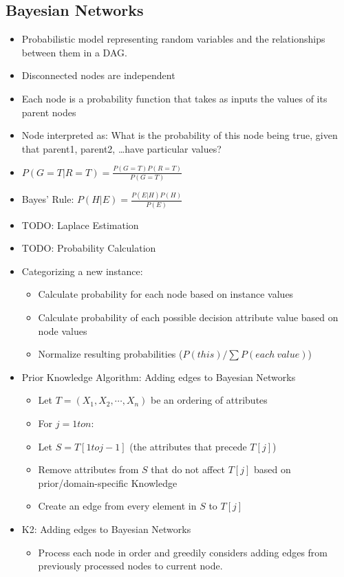 \documentclass{article}
\begin{document}
\subsection{Bayesian Networks}
\begin{itemize}
	\item Probabilistic model representing random variables and the relationships between them in a DAG.
	\item Disconnected nodes are independent
	\item Each node is a probability function that takes as inputs the values of its parent nodes
	\item Node interpreted as: What is the probability of this node being true, given that parent1, parent2, \ldots have particular values?
	\item $P(G = T | R = T) = \frac{P(G = T) P(R = T)}{P(G = T)}$
	\item Bayes' Rule: $P(H | E) = \frac{P(E | H) P(H)}{P(E)}$
	\item TODO: Laplace Estimation
	\item TODO: Probability Calculation
	\item Categorizing a new instance:
		\begin{itemize}
			\item Calculate probability for each node based on instance values
			\item Calculate probability of each possible decision attribute value based on node values
			\item Normalize resulting probabilities ($P(this) / \sum P(each\ value)$)
		\end{itemize}
	\item Prior Knowledge Algorithm: Adding edges to Bayesian Networks
		\begin{itemize}
			\item Let $T = (X_1, X_2, \cdots, X_n)$ be an ordering of attributes
			\item For $j = 1 to n$:
			\item Let $S = T[1 to j - 1]$ (the attributes that precede $T[j]$)
			\item Remove attributes from $S$ that do not affect $T[j]$ based on prior/domain-specific Knowledge
			\item Create an edge from every element in $S$ to $T[j]$
		\end{itemize}
	\item K2: Adding edges to Bayesian Networks
		\begin{itemize}
			\item Process each node in order and greedily considers adding edges from previously processed nodes to current node.

\end{itemize}
\end{itemize}
\end{document}
